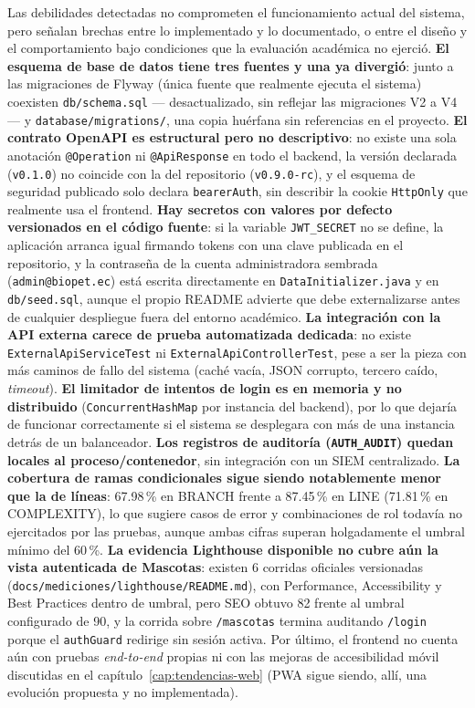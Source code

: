 Las debilidades detectadas no comprometen el funcionamiento actual del
sistema, pero se\~nalan brechas entre lo implementado y lo documentado, o
entre el dise\~no y el comportamiento bajo condiciones que la evaluaci\'on
acad\'emica no ejerci\'o. \textbf{El esquema de base de datos tiene tres
fuentes y una ya divergi\'o}: junto a las migraciones de Flyway (\'unica
fuente que realmente ejecuta el sistema) coexisten \texttt{db/schema.sql}
--- desactualizado, sin reflejar las migraciones V2 a V4 --- y
\texttt{database/migrations/}, una copia hu\'erfana sin referencias en el
proyecto. \textbf{El contrato OpenAPI es estructural pero no descriptivo}: no
existe una sola anotaci\'on \texttt{@Operation} ni \texttt{@ApiResponse} en
todo el backend, la versi\'on declarada (\texttt{v0.1.0}) no coincide con la
del repositorio (\texttt{v0.9.0-rc}), y el esquema de seguridad publicado
solo declara \texttt{bearerAuth}, sin describir la cookie \texttt{HttpOnly}
que realmente usa el frontend. \textbf{Hay secretos con valores por defecto
versionados en el c\'odigo fuente}: si la variable \texttt{JWT\_SECRET} no
se define, la aplicaci\'on arranca igual firmando tokens con una clave
publicada en el repositorio, y la contrase\~na de la cuenta administradora
sembrada (\texttt{admin@biopet.ec}) est\'a escrita directamente en
\texttt{DataInitializer.java} y en \texttt{db/seed.sql}, aunque el propio
README advierte que debe externalizarse antes de cualquier despliegue fuera
del entorno acad\'emico. \textbf{La integraci\'on con la API externa carece
de prueba automatizada dedicada}: no existe \texttt{ExternalApiServiceTest}
ni \texttt{ExternalApiControllerTest}, pese a ser la pieza con m\'as caminos
de fallo del sistema (cach\'e vac\'ia, JSON corrupto, tercero ca\'ido,
\emph{timeout}). \textbf{El limitador de intentos de login es en memoria y
no distribuido} (\texttt{ConcurrentHashMap} por instancia del backend), por
lo que dejar\'ia de funcionar correctamente si el sistema se desplegara con
m\'as de una instancia detr\'as de un balanceador. \textbf{Los registros de
auditor\'ia (\texttt{AUTH\_AUDIT}) quedan locales al proceso/contenedor}, sin
integraci\'on con un SIEM centralizado. \textbf{La cobertura de ramas
condicionales sigue siendo notablemente menor que la de l\'ineas}: 67.98\,\%
en BRANCH frente a 87.45\,\% en LINE (71.81\,\% en COMPLEXITY), lo que
sugiere casos de error y combinaciones de rol todav\'ia no ejercitados por
las pruebas, aunque ambas cifras superan holgadamente el umbral m\'inimo del
60\,\%. \textbf{La evidencia Lighthouse disponible no cubre a\'un la vista
autenticada de Mascotas}: existen 6 corridas oficiales versionadas
(\texttt{docs/mediciones/lighthouse/README.md}), con Performance,
Accessibility y Best Practices dentro de umbral, pero SEO obtuvo 82 frente
al umbral configurado de 90, y la corrida sobre \texttt{/mascotas} termina
auditando \texttt{/login} porque el \texttt{authGuard} redirige sin sesi\'on
activa. Por \'ultimo, el frontend no cuenta a\'un con pruebas \emph{end-to-end}
propias ni con las mejoras de accesibilidad m\'ovil discutidas en el
cap\'itulo~\ref{cap:tendencias-web} (PWA sigue siendo, all\'i, una
evoluci\'on propuesta y no implementada).

